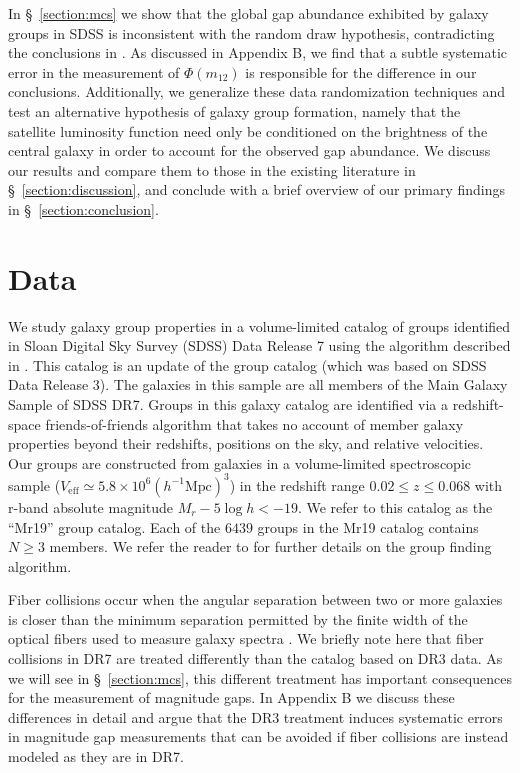 \documentclass[usenatbib,usegraphicx,letterpaper]{mn2e}
\newcommand{\monetwo}{m_{12}}
\newcommand{\veff}{V_{\mathrm{eff}}}
\newcommand{\hmpc}{h^{-1}\mathrm{Mpc}}
\begin{document}
In \S~\ref{section:mcs} we show that the global gap abundance
exhibited by galaxy groups in SDSS is inconsistent with the random
draw hypothesis, contradicting the conclusions in
\citet{paranjape_sheth11}. As discussed in Appendix B, we find that a
subtle systematic error in the \citet{paranjape_sheth11} measurement
of $\Phi(\monetwo)$ is responsible for the difference in our
conclusions. Additionally, we generalize these data randomization
techniques and test an alternative hypothesis of galaxy group
formation, namely that the satellite luminosity function need only be
conditioned on the brightness of the central galaxy in order to
account for the observed gap abundance.  We discuss our results and
compare them to those in the existing literature in
\S~\ref{section:discussion}, and conclude with a brief overview of our
primary findings in \S~\ref{section:conclusion}.


\section{Data}
\label{section:data}

We study galaxy group properties in a volume-limited catalog of 
groups identified in Sloan Digital Sky Survey (SDSS) 
Data Release 7 \cite[][DR7 hereafter]{sdss_dr7}
using the algorithm described in \cite{berlind_etal06}. 
This catalog is an update of the \citet{berlind_etal06} group 
catalog (which was based on SDSS Data Release 3). 
The galaxies in this sample are all members of the Main
Galaxy Sample of SDSS DR7. Groups in this galaxy catalog are
identified via a redshift-space friends-of-friends algorithm that
takes no account of member galaxy properties beyond their redshifts, 
positions on the sky, and relative velocities. Our groups are constructed from galaxies in
a volume-limited spectroscopic sample ($\veff \simeq 5.8 \times10^{6}(\hmpc)^3$) in the redshift range 
$0.02 \le z \le 0.068$ with r-band absolute magnitude $M_r - 5\log h < -19$. 
We refer to this catalog as the ``Mr19'' group catalog. Each of the
$6439$ groups in the Mr19 catalog contains $N \geq 3$ members. We refer
the reader to \citet{berlind_etal06} for further details on the  group
finding algorithm. 

Fiber collisions occur when the angular separation between two or more
galaxies is closer than the minimum separation permitted by the finite
width of the optical fibers used to measure galaxy spectra 
\citep[see][and references therein]{guo_etal12}. We briefly note here that
fiber collisions in DR7 are treated differently than the catalog based
on DR3 data. As we will see in \S~\ref{section:mcs}, this different
treatment has important consequences for the measurement of magnitude
gaps. In Appendix B we discuss these differences in detail and argue
that the DR3 treatment induces systematic errors in magnitude gap
measurements that can be avoided if fiber collisions are instead
modeled as they are in DR7.
\end{document}

